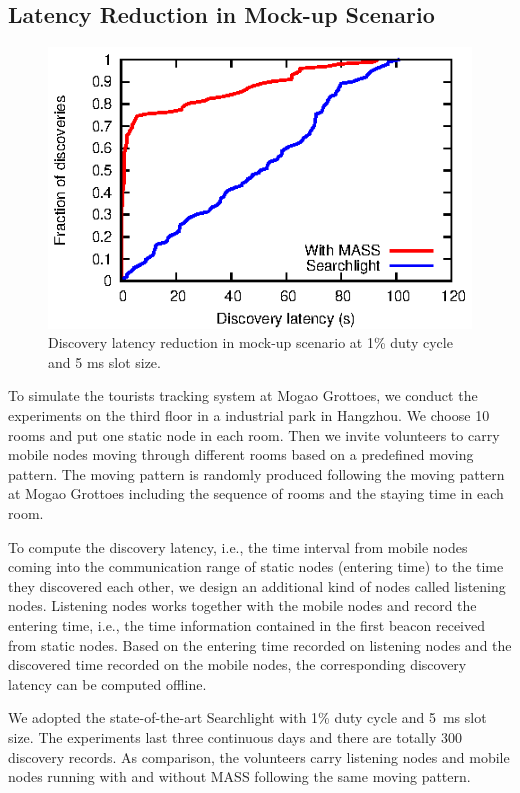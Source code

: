 \documentclass[twoside,twocolumn]{article}
\begin{document}
\subsection{Latency Reduction in Mock-up Scenario}
\begin{figure}[t]
   \centering
   \includegraphics{graphs/latency-mockup/latency-reduction}
   \caption{Discovery latency reduction in mock-up scenario at 1\% duty cycle and 5 ms slot size.}
   \label{fig:latency-reduction}
\end{figure}

To simulate the tourists tracking system at Mogao Grottoes, we conduct
the experiments on the third floor in a industrial park in Hangzhou.
We choose 10 rooms and put one static node in each room. Then we invite 
volunteers to carry mobile nodes moving through different rooms based 
on a predefined moving pattern. The moving pattern is randomly produced
following the moving pattern at Mogao Grottoes including the sequence
of rooms and the staying time in each room. 

To compute the discovery latency, i.e., the time interval from mobile
nodes coming into the communication range of static nodes (entering
time) to the time they discovered each other, we design an additional 
kind of nodes called listening nodes. Listening nodes works together 
with the mobile nodes and record the entering time, i.e., the time
information contained in the first beacon received from static nodes.
Based on the entering time recorded on listening nodes and the discovered
time recorded on the mobile nodes, the corresponding discovery latency
can be computed offline.

We adopted the state-of-the-art Searchlight with 1\% duty cycle and 
5~ms slot size. The experiments last three continuous days and there
are totally 300 discovery records. As comparison, the volunteers carry 
listening nodes and mobile nodes running with and without MASS following 
the same moving pattern.
\end{document}
